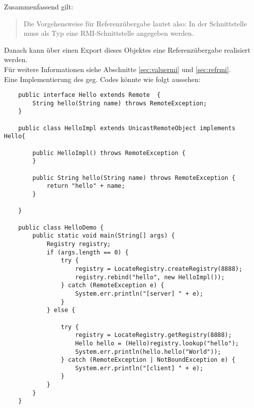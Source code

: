 \noindent
Zusammenfassend gilt:

\blockquote[{\cite[344]{Oec22}}]{
    Die Vorgehensweise für Referenzübergabe lautet also: In der Schnittstelle muss als Typ eine RMI-Schnittstelle angegeben werden.
}

\noindent
Danach kann über einen Export dieses Objektes eine Referenzübergabe realisiert werden.\\

\noindent
Für weitere Informationen siehe Abschnitte \ref{sec:valuermi} und \ref{sec:refrmi}.\\

\noindent
Eine Implementierung des geg. Codes könnte wie folgt aussehen:

\begin{verbatim}
    public interface Hello extends Remote  {
        String hello(String name) throws RemoteException;
    }

    public class HelloImpl extends UnicastRemoteObject implements Hello{

        public HelloImpl() throws RemoteException {
        }

        public String hello(String name) throws RemoteException {
            return "hello" + name;
        }

    }

    public class HelloDemo {
        public static void main(String[] args) {
            Registry registry;
            if (args.length == 0) {
                try {
                    registry = LocateRegistry.createRegistry(8888);
                    registry.rebind("hello", new HelloImpl());
                } catch (RemoteException e) {
                    System.err.println("[server] " + e);
                }
            } else {

                try {
                    registry = LocateRegistry.getRegistry(8888);
                    Hello hello = (Hello)registry.lookup("hello");
                    System.err.println(hello.hello("World"));
                } catch (RemoteException | NotBoundException e) {
                    System.err.println("[client] " + e);
                }
            }
        }
    }
\end{verbatim}